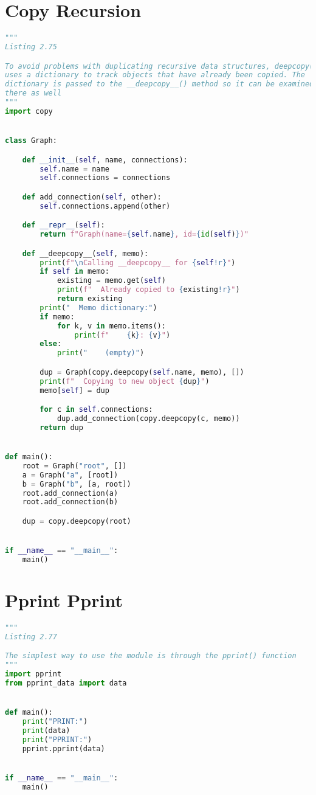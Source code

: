\documentclass[a4paper,landscape]{report}
\begin{document}
\section{Copy Recursion}
\begin{lstlisting}[language=Python]
"""
Listing 2.75

To avoid problems with duplicating recursive data structures, deepcopy()
uses a dictionary to track objects that have already been copied. The
dictionary is passed to the __deepcopy__() method so it can be examined
there as well
"""
import copy


class Graph:

    def __init__(self, name, connections):
        self.name = name
        self.connections = connections

    def add_connection(self, other):
        self.connections.append(other)

    def __repr__(self):
        return f"Graph(name={self.name}, id={id(self)})"

    def __deepcopy__(self, memo):
        print(f"\nCalling __deepcopy__ for {self!r}")
        if self in memo:
            existing = memo.get(self)
            print(f"  Already copied to {existing!r}")
            return existing
        print("  Memo dictionary:")
        if memo:
            for k, v in memo.items():
                print(f"    {k}: {v}")
        else:
            print("    (empty)")

        dup = Graph(copy.deepcopy(self.name, memo), [])
        print(f"  Copying to new object {dup}")
        memo[self] = dup

        for c in self.connections:
            dup.add_connection(copy.deepcopy(c, memo))
        return dup


def main():
    root = Graph("root", [])
    a = Graph("a", [root])
    b = Graph("b", [a, root])
    root.add_connection(a)
    root.add_connection(b)

    dup = copy.deepcopy(root)


if __name__ == "__main__":
    main()

\end{lstlisting}
\section{Pprint Pprint}
\begin{lstlisting}[language=Python]
"""
Listing 2.77

The simplest way to use the module is through the pprint() function
"""
import pprint
from pprint_data import data


def main():
    print("PRINT:")
    print(data)
    print("PPRINT:")
    pprint.pprint(data)


if __name__ == "__main__":
    main()

\end{lstlisting}
\end{document}
